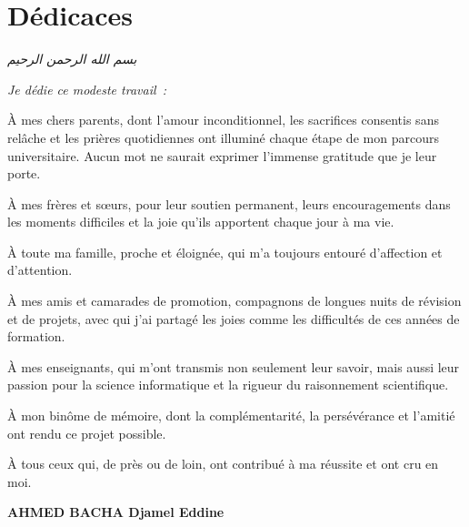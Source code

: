 \chapter*{Dédicaces}
\thispagestyle{empty}

\begin{center}
\textit{\textarabic{بسم الله الرحمن الرحيم}}
\end{center}

\vspace{0.6cm}

{\large\itshape
Je dédie ce modeste travail~:

\vspace{0.2cm}

À mes chers parents, dont l'amour inconditionnel, les sacrifices consentis sans relâche et les prières quotidiennes ont illuminé chaque étape de mon parcours universitaire. Aucun mot ne saurait exprimer l'immense gratitude que je leur porte.

\vspace{0.2cm}

À mes frères et sœurs, pour leur soutien permanent, leurs encouragements dans les moments difficiles et la joie qu'ils apportent chaque jour à ma vie.

\vspace{0.2cm}

À toute ma famille, proche et éloignée, qui m'a toujours entouré d'affection et d'attention.

\vspace{0.2cm}

À mes amis et camarades de promotion, compagnons de longues nuits de révision et de projets, avec qui j'ai partagé les joies comme les difficultés de ces années de formation.

\vspace{0.2cm}

À mes enseignants, qui m'ont transmis non seulement leur savoir, mais aussi leur passion pour la science informatique et la rigueur du raisonnement scientifique.

\vspace{0.2cm}

À mon binôme de mémoire, dont la complémentarité, la persévérance et l'amitié ont rendu ce projet possible.

\vspace{0.2cm}

À tous ceux qui, de près ou de loin, ont contribué à ma réussite et ont cru en moi.

\vspace{0.6cm}
\hfill\textbf{AHMED BACHA Djamel Eddine}
}

